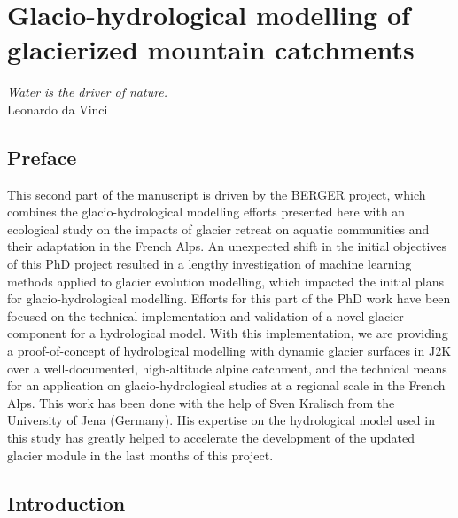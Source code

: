 \chapter{Glacio-hydrological modelling of glacierized mountain catchments}
\label{chap:discussion}

\begin{flushright}
\begin{small}
\textit{Water is the driver of nature.}\\
Leonardo da Vinci
\end{small}
\end{flushright}

\section*{Preface}

This second part of the manuscript is driven by the BERGER project, which combines the glacio-hydrological modelling efforts presented here with an ecological study on the impacts of glacier retreat on aquatic communities and their adaptation in the French Alps. An unexpected shift in the initial objectives of this PhD project resulted in a lengthy investigation of machine learning methods applied to glacier evolution modelling, which impacted the initial plans for glacio-hydrological modelling. Efforts for this part of the PhD work have been focused on the technical implementation and validation of a novel glacier component for a hydrological model. With this implementation, we are providing a proof-of-concept of hydrological modelling with dynamic glacier surfaces in J2K over a well-documented, high-altitude alpine catchment, and the technical means for an application on glacio-hydrological studies at a regional scale in the French Alps. This work has been done with the help of Sven Kralisch from the University of Jena (Germany). His expertise on the hydrological model used in this study has greatly helped to accelerate the development of the updated glacier module in the last months of this project.

\section{Introduction}

